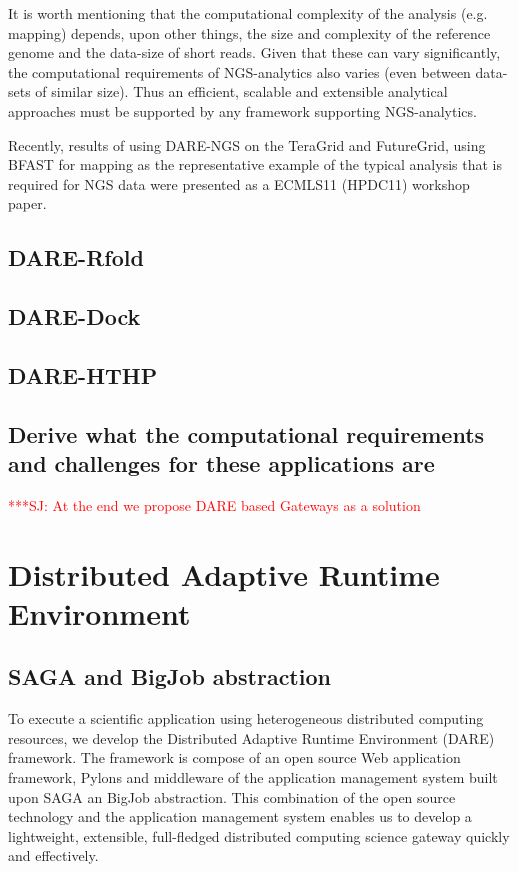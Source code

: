 \documentclass[12pt]{article}
\newcommand{\jhanote}[1]{ {\textcolor{red}     {***SJ: #1}}}
\newcommand{\jhanote}[1]{}
\begin{document}
It is worth mentioning that the computational complexity
of the analysis (e.g. mapping) depends, upon other things, the size
and complexity of the reference genome and the data-size of short reads.
Given that these can vary significantly, the computational
requirements of NGS-analytics also varies (even between data-sets of
similar size).  Thus an efficient, scalable and extensible analytical
approaches must be supported by any framework supporting
NGS-analytics.

Recently, results of using DARE-NGS on the TeraGrid and
FutureGrid, using BFAST for mapping as the representative example of
the typical analysis that is required for NGS data were presented as a ECMLS11 (HPDC11) workshop paper.  

\subsection{DARE-Rfold}


\subsection{DARE-Dock}



\subsection{DARE-HTHP}


\subsection{Derive what the computational requirements and challenges
  for these applications are}


\jhanote{At the end we propose DARE based Gateways as a solution}


\section{Distributed Adaptive Runtime Environment}

\subsection{SAGA and BigJob abstraction}

To execute a scientific application using heterogeneous distributed computing resources, we develop the Distributed Adaptive Runtime Environment (DARE) framework\cite{dareurl}.  The framework is compose of an open source Web application framework, Pylons
and middleware of the application management system built upon SAGA an BigJob abstraction\cite{saga-ccgrid10,saga-royalsoc,saga-web,jha2009developing,ecmls10}.  This combination of the open source technology and the application management system enables us to develop a lightweight, extensible, full-fledged distributed computing science gateway quickly and effectively\cite{pylonsurl}. 
\end{document}
